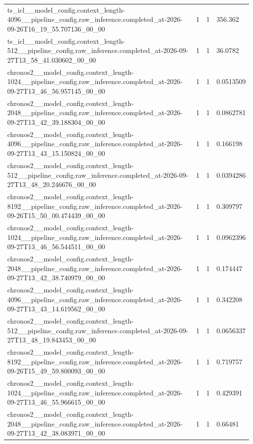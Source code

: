\begin{tabular}{llll}
ts\_icl\_\_model\_config.context\_length-4096\_\_pipeline\_config.raw\_inference.completed\_at-2026-09-26T16\_19\_55.707136\_00\_00 & 1 & 1 & 356.362 \\
ts\_icl\_\_model\_config.context\_length-512\_\_pipeline\_config.raw\_inference.completed\_at-2026-09-27T13\_58\_41.030602\_00\_00 & 1 & 1 & 36.0782 \\
chronos2\_\_model\_config.context\_length-1024\_\_pipeline\_config.raw\_inference.completed\_at-2026-09-27T13\_46\_56.957145\_00\_00 & 1 & 1 & 0.0513509 \\
chronos2\_\_model\_config.context\_length-2048\_\_pipeline\_config.raw\_inference.completed\_at-2026-09-27T13\_42\_39.188304\_00\_00 & 1 & 1 & 0.0862781 \\
chronos2\_\_model\_config.context\_length-4096\_\_pipeline\_config.raw\_inference.completed\_at-2026-09-27T13\_43\_15.150824\_00\_00 & 1 & 1 & 0.166198 \\
chronos2\_\_model\_config.context\_length-512\_\_pipeline\_config.raw\_inference.completed\_at-2026-09-27T13\_48\_20.246676\_00\_00 & 1 & 1 & 0.0394286 \\
chronos2\_\_model\_config.context\_length-8192\_\_pipeline\_config.raw\_inference.completed\_at-2026-09-26T15\_50\_00.474439\_00\_00 & 1 & 1 & 0.309797 \\
chronos2\_\_model\_config.context\_length-1024\_\_pipeline\_config.raw\_inference.completed\_at-2026-09-27T13\_46\_56.544511\_00\_00 & 1 & 1 & 0.0962396 \\
chronos2\_\_model\_config.context\_length-2048\_\_pipeline\_config.raw\_inference.completed\_at-2026-09-27T13\_42\_38.740979\_00\_00 & 1 & 1 & 0.174447 \\
chronos2\_\_model\_config.context\_length-4096\_\_pipeline\_config.raw\_inference.completed\_at-2026-09-27T13\_43\_14.619562\_00\_00 & 1 & 1 & 0.342208 \\
chronos2\_\_model\_config.context\_length-512\_\_pipeline\_config.raw\_inference.completed\_at-2026-09-27T13\_48\_19.843453\_00\_00 & 1 & 1 & 0.0656337 \\
chronos2\_\_model\_config.context\_length-8192\_\_pipeline\_config.raw\_inference.completed\_at-2026-09-26T15\_49\_59.800093\_00\_00 & 1 & 1 & 0.719757 \\
chronos2\_\_model\_config.context\_length-1024\_\_pipeline\_config.raw\_inference.completed\_at-2026-09-27T13\_46\_55.966615\_00\_00 & 1 & 1 & 0.429391 \\
chronos2\_\_model\_config.context\_length-2048\_\_pipeline\_config.raw\_inference.completed\_at-2026-09-27T13\_42\_38.083971\_00\_00 & 1 & 1 & 0.66481 \\

\end{tabular}
